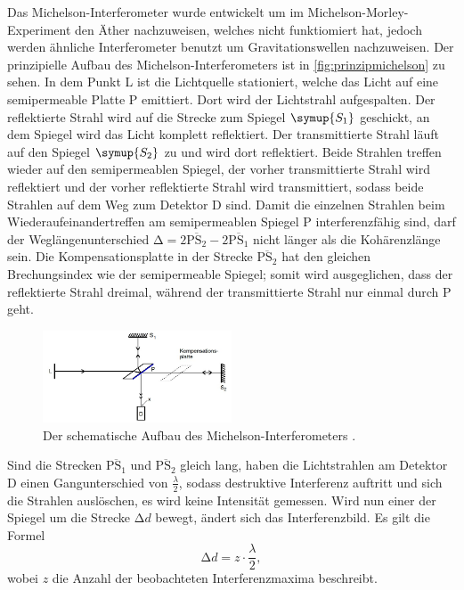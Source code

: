 Das Michelson-Interferometer wurde entwickelt um im Michelson-Morley-Experiment den Äther nachzuweisen, welches nicht funktiomiert hat, jedoch werden ähnliche Interferometer benutzt
um Gravitationswellen nachzuweisen. Der prinzipielle Aufbau des Michelson-Interferometers ist in \autoref{fig:prinzipmichelson} zu sehen. In dem Punkt L ist die Lichtquelle stationiert,
welche das Licht auf eine semipermeable Platte P emittiert. Dort wird der Lichtstrahl aufgespalten. Der reflektierte Strahl wird auf die Strecke zum Spiegel $\symup{S_1}$ geschickt, 
an dem Spiegel wird das Licht komplett reflektiert. Der transmittierte Strahl läuft auf den Spiegel $\symup{S_2}$ zu und wird dort reflektiert. Beide Strahlen treffen wieder auf den
semipermeablen Spiegel, der vorher transmittierte Strahl wird reflektiert und der vorher reflektierte Strahl wird transmittiert, sodass beide Strahlen auf dem Weg zum Detektor D sind.
Damit die einzelnen Strahlen beim Wiederaufeinandertreffen am semipermeablen Spiegel P interferenzfähig sind, darf der Weglängenunterschied 
$ \increment = 2\overline{\text{PS}_2} - 2\overline{\text{PS}_1} $ nicht länger als die Kohärenzlänge sein. Die Kompensationsplatte in der Strecke
$\overline{\text{PS}_2}$  hat den gleichen Brechungsindex wie der semipermeable Spiegel; somit wird ausgeglichen, dass der reflektierte Strahl dreimal,
während der transmittierte Strahl nur einmal durch P geht.
\begin{figure}
    \centering
    \includegraphics[width=0.5\textwidth]{content/prinzipmichelson.jpg}
    \caption{Der schematische Aufbau des Michelson-Interferometers \cite{anleitung}.}
    \label{fig:prinzipmichelson}
\end{figure}

\noindent
Sind die Strecken $\overline{\text{PS}_1}$ und $\overline{\text{PS}_2}$ gleich lang, haben die Lichtstrahlen am Detektor D einen Gangunterschied von $\frac{\lambda}{2}$, sodass 
destruktive Interferenz auftritt und sich die Strahlen auslöschen, es wird keine Intensität gemessen. Wird nun einer der Spiegel um die Strecke $\increment d$ bewegt, ändert sich
das Interferenzbild. Es gilt die Formel
\begin{equation}\label{eqn:forlambda}
    \increment d = z \cdot \frac{\lambda}{2}, 
\end{equation}
wobei $z$ die Anzahl der beobachteten Interferenzmaxima beschreibt.

